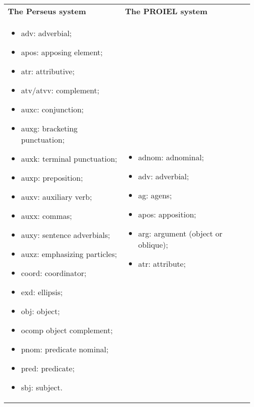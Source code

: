 \begin{table}
  \begin{tabular}{|l|l|}
        \hline
        \textbf{The Perseus system} & \textbf{The PROIEL system} \\ \thickhline
        \begin{minipage}{2.5in}
          \begin{itemize}[noitemsep,topsep=0pt,parsep=0pt,partopsep=0pt]
          \item adv: adverbial;
          \item apos: apposing element;
          \item atr: attributive;
          \item atv/atvv: complement;
          \item auxc: conjunction;
          \item auxg: bracketing punctuation;
          \item auxk: terminal punctuation;
          \item auxp: preposition;
          \item auxv: auxiliary verb;
          \item auxx: commas;
          \item auxy: sentence adverbials;
          \item auxz: emphasizing particles;
          \item coord: coordinator;
          \item exd: ellipsis;
          \item obj: object;
          \item ocomp object complement;
          \item pnom: predicate nominal;
          \item pred: predicate;
          \item sbj: subject.
          \end{itemize}
        \end{minipage} &
        \begin{minipage}{2.5in}
          \begin{itemize}[noitemsep,topsep=0pt,parsep=0pt,partopsep=0pt]
          \item adnom: adnominal;
          \item adv: adverbial;
          \item ag: agens;
          \item apos: apposition;
          \item arg: argument (object or oblique);
          \item atr: attribute;

\end{itemize}
\end{minipage}
\end{tabular}
\end{table}
